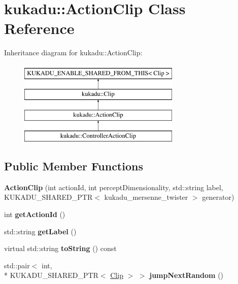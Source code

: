 \hypertarget{classkukadu_1_1ActionClip}{\section{kukadu\-:\-:Action\-Clip Class Reference}
\label{classkukadu_1_1ActionClip}
}
Inheritance diagram for kukadu\-:\-:Action\-Clip\-:\begin{figure}[H]
\begin{center}
\leavevmode
\includegraphics[height=4.000000cm]{classkukadu_1_1ActionClip}
\end{center}
\end{figure}
\subsection*{Public Member Functions}
\begin{DoxyCompactItemize}
\item 
\hypertarget{classkukadu_1_1ActionClip_a573285d8981842eb3bd73ee0eceef975}{{\bfseries Action\-Clip} (int action\-Id, int percept\-Dimensionality, std\-::string label, K\-U\-K\-A\-D\-U\-\_\-\-S\-H\-A\-R\-E\-D\-\_\-\-P\-T\-R$<$ kukadu\-\_\-mersenne\-\_\-twister $>$ generator)}\label{classkukadu_1_1ActionClip_a573285d8981842eb3bd73ee0eceef975}

\item 
\hypertarget{classkukadu_1_1ActionClip_a25f3c4c0f45fc94be915d03231024c25}{int {\bfseries get\-Action\-Id} ()}\label{classkukadu_1_1ActionClip_a25f3c4c0f45fc94be915d03231024c25}

\item 
\hypertarget{classkukadu_1_1ActionClip_a14ec94afcf87bd276f2b3f1c7b9b810f}{std\-::string {\bfseries get\-Label} ()}\label{classkukadu_1_1ActionClip_a14ec94afcf87bd276f2b3f1c7b9b810f}

\item 
\hypertarget{classkukadu_1_1ActionClip_aeff3b2812cc84231eea29f80e6905ff8}{virtual std\-::string {\bfseries to\-String} () const }\label{classkukadu_1_1ActionClip_aeff3b2812cc84231eea29f80e6905ff8}

\item 
\hypertarget{classkukadu_1_1ActionClip_a4c670bb04a291d7dd8ac83d23779b219}{std\-::pair$<$ int, \\*
K\-U\-K\-A\-D\-U\-\_\-\-S\-H\-A\-R\-E\-D\-\_\-\-P\-T\-R$<$ \hyperlink{classkukadu_1_1Clip}{Clip} $>$ $>$ {\bfseries jump\-Next\-Random} ()}\label{classkukadu_1_1ActionClip_a4c670bb04a291d7dd8ac83d23779b219}

\end{DoxyCompactItemize}
